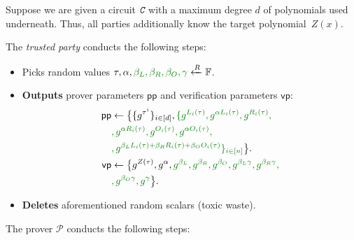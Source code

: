 \documentclass[../lecture-notes.tex]{subfiles}
\begin{document}
\begin{tcolorbox}[breakable, title=Attempt \#3: Sound SNARK Protocol,
    colback=blue!5!white,
    colframe=blue!75!black,
    colbacktitle=blue!25!white,
    coltitle=blue!20!black,
    fonttitle=\bfseries,
    boxrule=1.25pt,
    subtitle style={boxrule=0pt,
    colback=blue!20!white,
    colupper=blue!75!gray} ]

    Suppose we are given a circuit $\textit{\texttt{C}}$ with a maximum degree $d$ of polynomials used underneath. Thus, all parties additionally know the target polynomial~$Z(x)$.

    The \emph{trusted party} conducts the following steps:
    \begin{itemize}[label=, left=0mm]
        \item Picks random values $\tau, \alpha, \textcolor{green!50!black}{\beta_L, \beta_R, \beta_O, \gamma} \xleftarrow{R} \mathbb{F}$.
        \item \textbf{Outputs} prover parameters $\mathsf{pp}$ and verification parameters $\mathsf{vp}$:
        \begin{equation*}
            \begin{aligned}
                \mathsf{pp} & \gets \big\{\{g^{\tau^i}\}_{i \in [d]}, \textcolor{green!50!black}{\{g^{L_i(\tau)}, g^{\alpha L_i(\tau)}, g^{R_i(\tau)},} \\ 
                            & \textcolor{green!50!black}{, g^{\alpha R_i(\tau)}, g^{O_i(\tau)}, g^{\alpha O_i(\tau)},} \\
                            & \textcolor{green!50!black}{, g^{\beta_LL_i(\tau)+\beta_RR_i(\tau)+\beta_OO_i(\tau)}\}_{i \in [n]}}  \big\}. \\
                \mathsf{vp} & \gets \big\{ g^{Z(\tau)}, g^{\alpha}, \textcolor{green!50!black}{g^{\beta_L}, g^{\beta_R}, g^{\beta_O}, g^{\beta_L\gamma}, g^{\beta_R\gamma},} \\
                            & \textcolor{green!50!black}{, g^{\beta_O\gamma}, g^{\gamma}}  \big\}.
            \end{aligned}
        \end{equation*}
        \item \textbf{Deletes} aforementioned random scalars (toxic waste).
    \end{itemize}
    \newpage
    The prover $\mathcal{P}$ conducts the following steps:
    \begin{itemize}[label=, left=0mm]

\end{itemize}
\end{tcolorbox}
\end{document}
